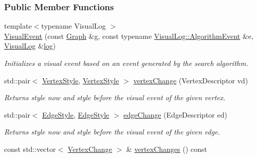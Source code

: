\subsubsection*{Public Member Functions}
\begin{DoxyCompactItemize}
\item 
{\footnotesize template$<$typename Visual\+Log $>$ }\\\hyperlink{structslb_1_1core_1_1ui_1_1VisualEvent_a47f34ef91db6111df832f4e5f4066611}{Visual\+Event} (const \hyperlink{structslb_1_1core_1_1ui_1_1StateGraph}{Graph} \&g, const typename \hyperlink{structslb_1_1core_1_1ui_1_1VisualLog_a699a50e2c261b3dec6cd2fa6bfd4b295}{Visual\+Log\+::\+Algorithm\+Event} \&e, \hyperlink{structslb_1_1core_1_1ui_1_1VisualLog}{Visual\+Log} \&\hyperlink{namespaceslb_1_1core_1_1ui_acdeb0db1847459cac6f4eeb22bbb5998}{log})
\begin{DoxyCompactList}\small\item\em Initializes a visual event based on an event generated by the search algorithm. \end{DoxyCompactList}\item 
std\+::pair$<$ \hyperlink{structslb_1_1core_1_1ui_1_1VisualEvent_a81ab7d486e4eb9afda92f9e052c3ea56}{Vertex\+Style}, \hyperlink{structslb_1_1core_1_1ui_1_1VisualEvent_a81ab7d486e4eb9afda92f9e052c3ea56}{Vertex\+Style} $>$ \hyperlink{structslb_1_1core_1_1ui_1_1VisualEvent_a09f7e0549163165521f61bccfa938f74}{vertex\+Change} (Vertex\+Descriptor vd)
\begin{DoxyCompactList}\small\item\em Returns style now and style before the visual event of the given vertex. \end{DoxyCompactList}\item 
std\+::pair$<$ \hyperlink{structslb_1_1core_1_1ui_1_1VisualEvent_ac004f17adad03549e2d7b07302e9c154}{Edge\+Style}, \hyperlink{structslb_1_1core_1_1ui_1_1VisualEvent_ac004f17adad03549e2d7b07302e9c154}{Edge\+Style} $>$ \hyperlink{structslb_1_1core_1_1ui_1_1VisualEvent_adab7d82da50694e38b62257feea87ab4}{edge\+Change} (Edge\+Descriptor ed)
\begin{DoxyCompactList}\small\item\em Returns style now and style before the visual event of the given edge. \end{DoxyCompactList}\item 
const std\+::vector$<$ \hyperlink{structslb_1_1core_1_1ui_1_1VisualEvent_1_1VertexChange}{Vertex\+Change} $>$ \& \hyperlink{structslb_1_1core_1_1ui_1_1VisualEvent_a541deab80c085f37e805da8dbc0cc83f}{vertex\+Changes} () const 

\end{DoxyCompactItemize}
